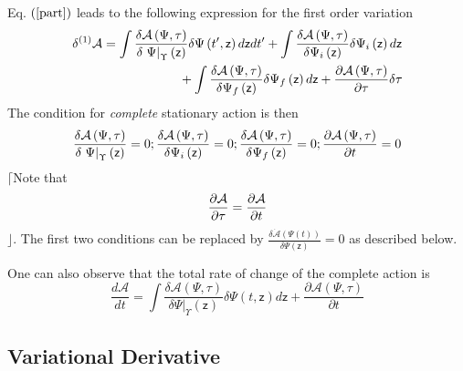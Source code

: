 \documentclass[aps,preprint]{revtex4}
\begin{document}
Eq. $\left( \ref{part}\right) $ leads to the following expression for the
first order variation%
\begin{align}
\delta ^{\left( 1\right) }\mathcal{A}& =\int \frac{\delta \mathcal{A}\left(
\Psi ,\tau \right) }{\delta \left. \Psi \right\vert _{\Upsilon }\left( 
\mathsf{z}\right) }\delta \Psi \left( t^{\prime },\mathsf{z}\right) d\mathsf{%
z}dt^{\prime }+\int \frac{\delta \mathcal{A}\left( \Psi ,\tau \right) }{%
\delta \Psi _{i}\left( \mathsf{z}\right) }\delta \Psi _{i}\left( \mathsf{z}%
\right) d\mathsf{z}  \notag \\
& \qquad \qquad \qquad +\int \frac{\delta \mathcal{A}\left( \Psi ,\tau
\right) }{\delta \Psi _{f}\left( \mathsf{z}\right) }\delta \Psi _{f}\left( 
\mathsf{z}\right) d\mathsf{z}+\frac{\partial \mathcal{A}\left( \Psi ,\tau
\right) }{\partial \tau }\delta \tau  \label{DA}
\end{align}%
The condition for \emph{complete }stationary action is then 
\begin{equation}
\frac{\delta \mathcal{A}\left( \Psi ,\tau \right) }{\delta \left. \Psi
\right\vert _{\Upsilon }\left( \mathsf{z}\right) }=0;\frac{\delta \mathcal{A}%
\left( \Psi ,\tau \right) }{\delta \Psi _{i}\left( \mathsf{z}\right) }=0;%
\frac{\delta \mathcal{A}\left( \Psi ,\tau \right) }{\delta \Psi _{f}\left( 
\mathsf{z}\right) }=0;\frac{\partial \mathcal{A}\left( \Psi ,\tau \right) }{%
\partial t}=0
\end{equation}%
$\lceil $Note that 
\begin{equation}
\frac{\partial \mathcal{A}}{\partial \tau }=\frac{\partial \mathcal{A}}{%
\partial t}
\end{equation}%
$\rfloor $. The first two conditions can be replaced by $\frac{\delta 
\mathcal{\dot{A}}\left( \Psi \left( t\right) \right) }{\delta \Psi \left( 
\mathsf{z}\right) }=0$ as described below.

One can also observe that the total rate of change of the complete action is 
\begin{equation}
\frac{d\mathcal{A}}{dt}=\int \frac{\delta \mathcal{A}\left( \Psi ,\tau
\right) }{\delta \left. \Psi \right\vert _{\Upsilon }\left( \mathsf{z}%
\right) }\delta \Psi \left( t,\mathsf{z}\right) d\mathsf{z}+\frac{\partial 
\mathcal{A}\left( \Psi ,\tau \right) }{\partial t}
\end{equation}

\subsection{Variational Derivative}
\end{document}
